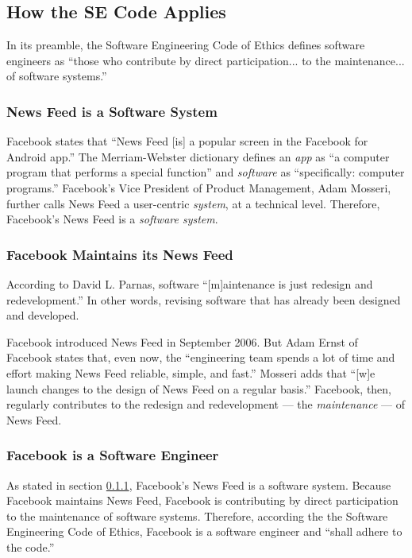 
\subsection{How the SE Code Applies}

\par In its preamble, the Software Engineering Code of Ethics defines software engineers as ``those who contribute by direct participation... to the maintenance... of software systems.''\cite{se_code} 

\subsubsection{News Feed is a Software System}
\label{se_system}

\par Facebook states that ``News Feed [is] a popular screen in the Facebook for Android app.'' \cite{fb_nf_android} The Merriam-Webster dictionary defines an \emph{app} as ``a computer program that performs a special function'' \cite{merriam_webster} and \emph{software} as ``specifically: computer programs.'' \cite{merriam_webster} Facebook's Vice President of Product Management, Adam Mosseri, further calls News Feed a user-centric \emph{system}, at a technical level. \cite{fb_nf_works} Therefore, Facebook's News Feed is a \emph{software system}.

\subsubsection{Facebook Maintains its News Feed}
\label{se_maintenance}

\par According to David L. Parnas, software ``[m]aintenance is just redesign and redevelopment.'' \cite{parnas} In other words, revising software that has already been designed and developed. \cite{merriam_webster}

\par Facebook introduced News Feed in September 2006. \cite{fb_newsroom} But Adam Ernst of Facebook states that, even now, the ``engineering team spends a lot of time and effort making News Feed reliable, simple, and fast.'' \cite{fb_nf_faster} Mosseri adds that ``[w]e launch changes to the design of News Feed on a regular basis.'' \cite{fb_nf_works} Facebook, then, regularly contributes to the redesign and redevelopment --- the \emph{maintenance} --- of News Feed.

\subsubsection{Facebook is a Software Engineer}

\par As stated in section \ref{se_system}, Facebook's News Feed is a software system. Because Facebook maintains News Feed, Facebook is contributing by direct participation to the maintenance of software systems. Therefore, according the the Software Engineering Code of Ethics, Facebook is a software engineer and ``shall adhere to the code.'' \cite{se_code}